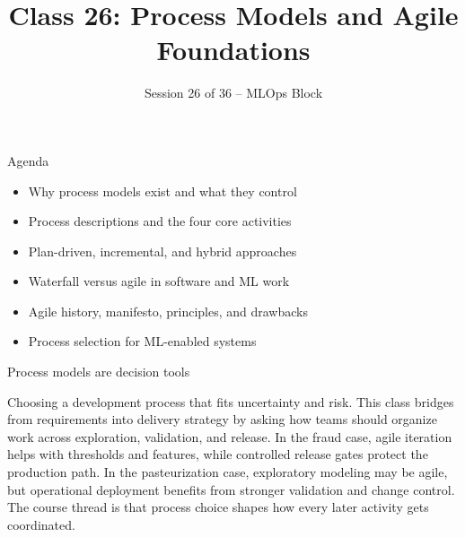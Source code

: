

\title{Class 26: Process Models and Agile Foundations}
\subtitle{Session 26 of 36 -- MLOps Block}
\author{\coursename}
\date{}



\frame{\titlepage \coursefooter}

\begin{frame}{Agenda}
\begin{itemize}
\item Why process models exist and what they control
\item Process descriptions and the four core activities
\item Plan-driven, incremental, and hybrid approaches
\item Waterfall versus agile in software and ML work
\item Agile history, manifesto, principles, and drawbacks
\item Process selection for ML-enabled systems
\end{itemize}
\coursefooter
\end{frame}

\begin{frame}{Process models are decision tools}
\coursefooter
\end{frame}

\coursecontextframe
{Choosing a development process that fits uncertainty and risk.}
{This class bridges from requirements into delivery strategy by asking how teams should organize work across exploration, validation, and release.}
{In the fraud case, agile iteration helps with thresholds and features, while controlled release gates protect the production path.}
{In the pasteurization case, exploratory modeling may be agile, but operational deployment benefits from stronger validation and change control.}
{The course thread is that process choice shapes how every later activity gets coordinated.}

